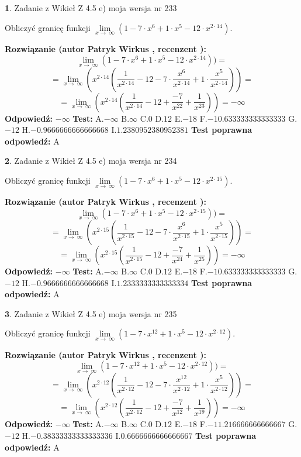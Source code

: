 \documentclass[12pt, a4paper]{article}
\theoremstyle{definition} %
\newtheorem{zad}{}
\newcommand{\zadStart}[1]{\begin{zad}#1\newline}
\newcommand{\zadStop}{\end{zad}}
\newcommand{\rozwStart}[2]{\noindent \textbf{Rozwiązanie (autor #1 , recenzent #2): }\newline}
\newcommand{\rozwStop}{\newline}
\newcommand{\odpStart}{\noindent \textbf{Odpowiedź:}\newline}
\newcommand{\odpStop}{\newline}
\newcommand{\testStart}{\noindent \textbf{Test:}\newline}
\newcommand{\testStop}{\newline}
\newcommand{\kluczStart}{\noindent \textbf{Test poprawna odpowiedź:}\newline}
\newcommand{\kluczStop}{\newline}
\begin{document}
\zadStart{Zadanie z Wikieł Z 4.5 e) moja wersja nr 233}


Obliczyć granicę funkcji  $\lim\limits_{x\to\ \infty}(1 - 7 \cdot x^{6}+1 \cdot x^{5}- 12 \cdot x^{2\cdot14})$.
\zadStop
\rozwStart{Patryk Wirkus}{}
$$\lim\limits_{x\to\ \infty}(1 - 7 \cdot x^{6}+1 \cdot x^{5}- 12 \cdot x^{2\cdot14}))=$$
$$=\lim\limits_{x\to\ \infty}(x^{2\cdot14}(\frac{1}{x^{2\cdot14}}-12 -7 \cdot \frac{x^{6}}{x^{2\cdot14}}+1 \cdot \frac{x^{5}}{x^{2\cdot14}}))=$$
$$=\lim\limits_{x\to\ \infty}(x^{2\cdot14}(\frac{1}{x^{2\cdot14}}-12 + \frac{-7}{x^{22}}+ \frac{1}{x^{23}}))=-\infty$$
\rozwStop
\odpStart
$-\infty$
\odpStop
\testStart
A.$-\infty$ B.$\infty$ C.$0$ D.$12$ E.$-18$
F.$-10.633333333333333$ G.$-12$
H.$-0.9666666666666668$
I.$1.2380952380952381$
\testStop
\kluczStart
A
\kluczStop



\zadStart{Zadanie z Wikieł Z 4.5 e) moja wersja nr 234}


Obliczyć granicę funkcji  $\lim\limits_{x\to\ \infty}(1 - 7 \cdot x^{6}+1 \cdot x^{5}- 12 \cdot x^{2\cdot15})$.
\zadStop
\rozwStart{Patryk Wirkus}{}
$$\lim\limits_{x\to\ \infty}(1 - 7 \cdot x^{6}+1 \cdot x^{5}- 12 \cdot x^{2\cdot15}))=$$
$$=\lim\limits_{x\to\ \infty}(x^{2\cdot15}(\frac{1}{x^{2\cdot15}}-12 -7 \cdot \frac{x^{6}}{x^{2\cdot15}}+1 \cdot \frac{x^{5}}{x^{2\cdot15}}))=$$
$$=\lim\limits_{x\to\ \infty}(x^{2\cdot15}(\frac{1}{x^{2\cdot15}}-12 + \frac{-7}{x^{24}}+ \frac{1}{x^{25}}))=-\infty$$
\rozwStop
\odpStart
$-\infty$
\odpStop
\testStart
A.$-\infty$ B.$\infty$ C.$0$ D.$12$ E.$-18$
F.$-10.633333333333333$ G.$-12$
H.$-0.9666666666666668$
I.$1.2333333333333334$
\testStop
\kluczStart
A
\kluczStop



\zadStart{Zadanie z Wikieł Z 4.5 e) moja wersja nr 235}


Obliczyć granicę funkcji  $\lim\limits_{x\to\ \infty}(1 - 7 \cdot x^{12}+1 \cdot x^{5}- 12 \cdot x^{2\cdot12})$.
\zadStop
\rozwStart{Patryk Wirkus}{}
$$\lim\limits_{x\to\ \infty}(1 - 7 \cdot x^{12}+1 \cdot x^{5}- 12 \cdot x^{2\cdot12}))=$$
$$=\lim\limits_{x\to\ \infty}(x^{2\cdot12}(\frac{1}{x^{2\cdot12}}-12 -7 \cdot \frac{x^{12}}{x^{2\cdot12}}+1 \cdot \frac{x^{5}}{x^{2\cdot12}}))=$$
$$=\lim\limits_{x\to\ \infty}(x^{2\cdot12}(\frac{1}{x^{2\cdot12}}-12 + \frac{-7}{x^{12}}+ \frac{1}{x^{19}}))=-\infty$$
\rozwStop
\odpStart
$-\infty$
\odpStop
\testStart
A.$-\infty$ B.$\infty$ C.$0$ D.$12$ E.$-18$
F.$-11.216666666666667$ G.$-12$
H.$-0.38333333333333336$
I.$0.6666666666666667$
\testStop
\kluczStart
A
\kluczStop
\end{document}
